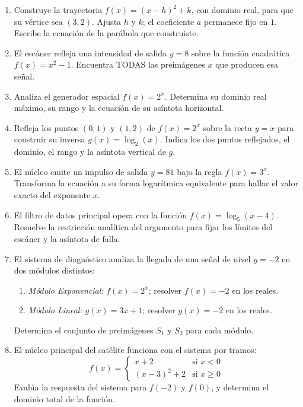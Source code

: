 \documentclass[12pt,a4paper]{article}
\begin{document}
\begin{enumerate}[label=\textbf{\arabic*.}, itemsep=2.5em]
\item Construye la trayectoria $f(x)=(x-h)^2+k$, con dominio real, para que su vértice sea $(3,2)$. Ajusta $h$ y $k$; el coeficiente $a$ permanece fijo en $1$. Escribe la ecuación de la parábola que construiste.

\item El escáner refleja una intensidad de salida $y = 8$ sobre la función cuadrática $f(x) = x^2 - 1$. Encuentra TODAS las preimágenes $x$ que producen esa señal.

\item Analiza el generador espacial $f(x)=2^x$. Determina su dominio real máximo, su rango y la ecuación de su asíntota horizontal.

\item Refleja los puntos $(0,1)$ y $(1,2)$ de $f(x)=2^x$ sobre la recta $y=x$ para construir su inversa $g(x)=\log_2(x)$. Indica los dos puntos reflejados, el dominio, el rango y la asíntota vertical de $g$.

\item El núcleo emite un impulso de salida $y = 81$ bajo la regla $f(x) = 3^x$. Transforma la ecuación a su forma logarítmica equivalente para hallar el valor exacto del exponente $x$.

\item El filtro de datos principal opera con la función $f(x) = \log_5(x - 4)$. Resuelve la restricción analítica del argumento para fijar los límites del escáner y la asíntota de falla.

\item El sistema de diagnóstico analiza la llegada de una señal de nivel $y = -2$ en dos módulos distintos:
  \begin{enumerate}[label=\arabic*), leftmargin=*, itemsep=0.2em]
    \item \textit{Módulo Exponencial:} $f(x)=2^x$; resolver $f(x)=-2$ en los reales.
    \item \textit{Módulo Lineal:} $g(x)=3x+1$; resolver $g(x)=-2$ en los reales.
  \end{enumerate}
  Determina el conjunto de preimágenes $S_1$ y $S_2$ para cada módulo.

\item El núcleo principal del satélite funciona con el sistema por tramos:
  \[
    f(x) =
    \begin{cases}
      x + 2 & \text{si } x < 0 \\[4pt]
      (x - 3)^2 + 2 & \text{si } x \ge 0
    \end{cases}
  \]
  Evalúa la respuesta del sistema para $f(-2)$ y $f(0)$, y determina el dominio total de la función.

\end{enumerate}
\end{document}
